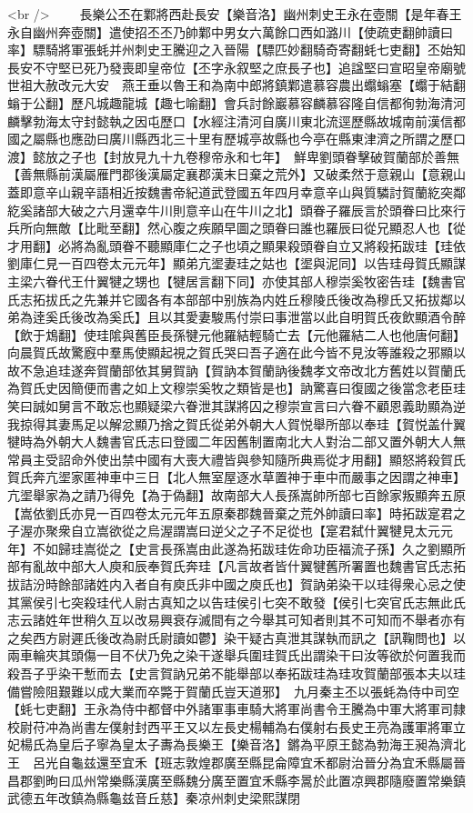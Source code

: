 <br />
　　長樂公丕在鄴將西赴長安【樂音洛】幽州刺史王永在壺關【是年春王永自幽州奔壺關】遣使招丕丕乃帥鄴中男女六萬餘口西如潞川【使疏吏翻帥讀曰率】驃騎將軍張蚝并州刺史王騰迎之入晉陽【驃匹妙翻騎奇寄翻蚝七吏翻】丕始知長安不守堅已死乃發喪即皇帝位【丕字永叙堅之庶長子也】追諡堅曰宣昭皇帝廟號世祖大赦改元大安　燕王垂以魯王和為南中郎將鎮鄴遣慕容農出蠮螉塞【蠮于結翻螉于公翻】歷凡城趣龍城【趣七喻翻】會兵討餘巖慕容麟慕容隆自信都徇勃海清河麟擊勃海太守封懿執之因屯歷口【水經注清河自廣川東北流逕歷縣故城南前漢信都國之屬縣也應劭曰廣川縣西北三十里有歷城亭故縣也今亭在縣東津濟之所謂之歷口渡】懿放之子也【封放見九十九卷穆帝永和七年】　鮮卑劉頭眷擊破賀蘭部於善無【善無縣前漢屬雁門郡後漢屬定襄郡漢末日棄之荒外】又破柔然于意親山【意親山蓋即意辛山親辛語相近按魏書帝紀道武登國五年四月幸意辛山與質驎討賀蘭紇突鄰紇奚諸部大破之六月還幸牛川則意辛山在牛川之北】頭眷子羅辰言於頭眷曰比來行兵所向無敵【比毗至翻】然心腹之疾願早圖之頭眷曰誰也羅辰曰從兄顯忍人也【從才用翻】必將為亂頭眷不聽顯庫仁之子也頃之顯果殺頭眷自立又將殺拓跋珪【珪依劉庫仁見一百四卷太元元年】顯弟亢埿妻珪之姑也【埿與泥同】以告珪母賀氏顯謀主梁六眷代王什翼犍之甥也【犍居言翻下同】亦使其部人穆崇奚牧密告珪【魏書官氏志拓拔氏之先兼并它國各有本部部中别族為内姓丘穆陵氏後改為穆氏又拓拔鄰以弟為逹奚氏後改為奚氏】且以其愛妻駿馬付崇曰事泄當以此自明賀氏夜飲顯酒令醉【飲于鴆翻】使珪隂與舊臣長孫犍元他羅結輕騎亡去【元他羅結二人也他唐何翻】向晨賀氏故驚廐中羣馬使顯起視之賀氏哭曰吾子適在此今皆不見汝等誰殺之邪顯以故不急追珪遂奔賀蘭部依其舅賀訥【賀訥本賀蘭訥後魏孝文帝改北方舊姓以賀蘭氏為賀氏史因簡便而書之如上文穆崇奚牧之類皆是也】訥驚喜曰復國之後當念老臣珪笑曰誠如舅言不敢忘也顯疑梁六眷泄其謀將囚之穆崇宣言曰六眷不顧恩義助顯為逆我掠得其妻馬足以解忿顯乃捨之賀氏從弟外朝大人賀悦舉所部以奉珪【賀悦盖什翼犍時為外朝大人魏書官氏志曰登國二年因舊制置南北大人對治二部又置外朝大人無常員主受詔命外使出禁中國有大喪大禮皆與參知隨所典焉從才用翻】顯怒將殺賀氏賀氏奔亢埿家匿神車中三日【北人無室屋逐水草置神于車中而嚴事之因謂之神車】亢埿舉家為之請乃得免【為于偽翻】故南部大人長孫嵩帥所部七百餘家叛顯奔五原【嵩依劉氏亦見一百四卷太元元年五原秦郡魏晉棄之荒外帥讀曰率】時拓跋寔君之子渥亦聚衆自立嵩欲從之烏渥謂嵩曰逆父之子不足從也【寔君弑什翼犍見太元元年】不如歸珪嵩從之【史言長孫嵩由此遂為拓跋珪佐命功臣福流子孫】久之劉顯所部有亂故中部大人庾和辰奉賀氏奔珪【凡言故者皆什翼犍舊所署置也魏書官氏志拓拔詰汾時餘部諸姓内入者自有庾氏非中國之庾氏也】賀訥弟染干以珪得衆心忌之使其黨侯引七突殺珪代人尉古真知之以告珪侯引七突不敢發【侯引七突官氏志無此氏志云諸姓年世稍久互以改易興衰存滅間有之今舉其可知者則其不可知而不舉者亦有之矣西方尉遲氏後改為尉氏尉讀如鬱】染干疑古真泄其謀執而訊之【訊鞠問也】以兩車輪夾其頭傷一目不伏乃免之染干遂舉兵圍珪賀氏出謂染干曰汝等欲於何置我而殺吾子乎染干慙而去【史言賀訥兄弟不能舉部以奉拓跋珪為珪攻賀蘭部張本夫以珪備嘗險阻艱難以成大業而卒斃于賀蘭氏豈天道邪】　九月秦主丕以張蚝為侍中司空【蚝七吏翻】王永為侍中都督中外諸軍事車騎大將軍尚書令王騰為中軍大將軍司隸校尉苻冲為尚書左僕射封西平王又以左長史楊輔為右僕射右長史王亮為護軍將軍立妃楊氏為皇后子寧為皇太子夀為長樂王【樂音洛】鏘為平原王懿為勃海王昶為濟北王　呂光自龜兹還至宜禾【班志敦煌郡廣至縣昆侖障宜禾都尉治晉分為宜禾縣屬晉昌郡劉昫曰瓜州常樂縣漢廣至縣魏分廣至置宜禾縣李暠於此置凉興郡隨廢置常樂鎮武德五年改鎮為縣龜兹音丘慈】秦凉州刺史梁熙謀閉